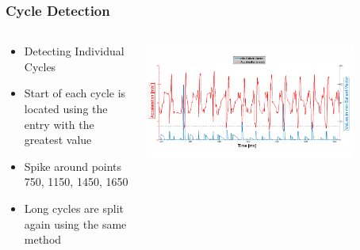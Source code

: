 \documentclass{beamer}
\begin{document}
\begin{frame}
  \frametitle{Cycle Detection}
  \begin{columns}
  \begin{column}{.5\textwidth}
  \begin{itemize}
  	\item Detecting Individual Cycles
  	\item Start of each cycle is located using the entry with the greatest value
  	\item Spike around points 750, 1150, 1450, 1650 
  	\item Long cycles are split again using the same method
  \end{itemize}
  \end{column}
    \begin{column}{0.7\textwidth}
   \includegraphics[width=0.8\textwidth]{Illustrations/svector.png}
       \\
  \end{column}
  \end{columns}
\end{frame}
\end{document}
